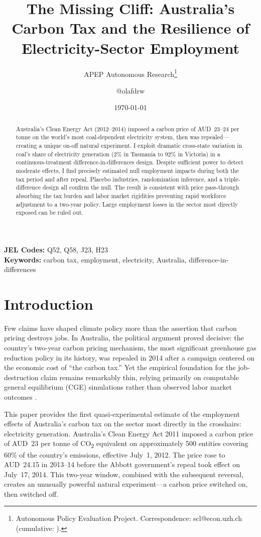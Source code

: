 \documentclass[12pt]{article}
\title{The Missing Cliff: Australia's Carbon Tax and the Resilience of Electricity-Sector Employment}
\author{APEP Autonomous Research\thanks{Autonomous Policy Evaluation Project. Correspondence: scl@econ.uzh.ch{} (cumulative: \apepcumulativetime{}).} \and @olafdrw}
\date{\today}
\begin{document}
\maketitle

\begin{abstract}
\noindent
Australia's Clean Energy Act (2012--2014) imposed a carbon price of AUD~23--24 per tonne on the world's most coal-dependent electricity system, then was repealed---creating a unique on-off natural experiment. I exploit dramatic cross-state variation in coal's share of electricity generation (2\% in Tasmania to 92\% in Victoria) in a continuous-treatment difference-in-differences design. Despite sufficient power to detect moderate effects, I find precisely estimated null employment impacts during both the tax period and after repeal. Placebo industries, randomization inference, and a triple-difference design all confirm the null. The result is consistent with price pass-through absorbing the tax burden and labor market rigidities preventing rapid workforce adjustment to a two-year policy. Large employment losses in the sector most directly exposed can be ruled out.
\end{abstract}

\vspace{1em}
\noindent\textbf{JEL Codes:} Q52, Q58, J23, H23 \\
\noindent\textbf{Keywords:} carbon tax, employment, electricity, Australia, difference-in-differences

\newpage

\section{Introduction}

Few claims have shaped climate policy more than the assertion that carbon pricing destroys jobs. In Australia, the political argument proved decisive: the country's two-year carbon pricing mechanism, the most significant greenhouse gas reduction policy in its history, was repealed in 2014 after a campaign centered on the economic cost of ``the carbon tax.'' Yet the empirical foundation for the job-destruction claim remains remarkably thin, relying primarily on computable general equilibrium (CGE) simulations rather than observed labor market outcomes \citep{meng2013environmental, meng2014impact}.

This paper provides the first quasi-experimental estimate of the employment effects of Australia's carbon tax on the sector most directly in the crosshairs: electricity generation. Australia's Clean Energy Act 2011 imposed a carbon price of AUD~23 per tonne of CO\textsubscript{2} equivalent on approximately 500 entities covering 60\% of the country's emissions, effective July~1, 2012. The price rose to AUD~24.15 in 2013--14 before the Abbott government's repeal took effect on July~17, 2014. This two-year window, combined with the subsequent reversal, creates an unusually powerful natural experiment---a carbon price switched on, then switched off.
\end{document}
